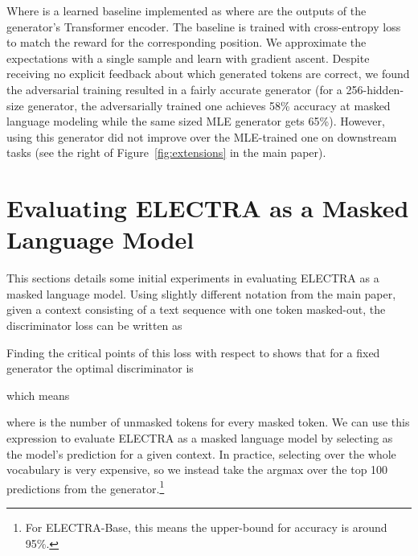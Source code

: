 \documentclass{article}
\newcommand{\alns}[1] {
	
}
\newcommand{\pdata}{p_{\text{data}}}
\newcommand{\pmask}{p_{\text{mask}}}
\newcommand{\lossds}{\mathcal{L}_\text{Disc}}
\begin{document}
Where  is a learned baseline implemented as  
where  are the outputs of the generator's Transformer encoder.
The baseline is trained with cross-entropy loss to match the reward for the corresponding position.
We approximate the expectations with a single sample and learn  with gradient ascent.
Despite receiving no explicit feedback about which generated tokens are correct, we found the adversarial training resulted in a fairly accurate generator (for a 256-hidden-size generator, the adversarially trained one achieves 58\% accuracy at masked language modeling while the same sized MLE generator gets 65\%).
However, using this generator did not improve over the MLE-trained one on downstream tasks (see the right of Figure~\ref{fig:extensions} in the main paper).

\section{Evaluating ELECTRA as a Masked Language Model}
This sections details some initial experiments in evaluating ELECTRA as a masked language model. 
Using slightly different notation from the main paper, given a context  consisting of a text sequence with one token  masked-out, the discriminator loss can be written as
\alns{
    \lossds = -\sum\limits_{x\in\text{vocab}} \Big( &(1 - \pmask) \pdata(x|c)\log D(x, c) + \text{\hspace{19mm}//unmasked token}\\
    &\pmask\pdata(x|c)p_G(x|c)\log D(x, c) + \text{\hspace{17mm}//generator samples correct token}\\
    &\pmask(1 - \pdata(x|c))p_G(x|c)\log(1 - D(x, c))\Big) \text{\hspace{2mm}//generator samples incorrect token} \\
}
Finding the critical points of this loss with respect to  shows that for a fixed generator the optimal discriminator is
\alns{
    D(x, c) = \pdata(x|c)(a + p_G(x|c))/(a\pdata(x|c) + p_G(x|c))
}
which means
\alns{
    \pdata(x|c) = D(x, c)p_G(x|c) / (a(1 - D(x, c)) + p_G(x|c))
}
where  is the number of unmasked tokens for every masked token.
We can use this expression to evaluate ELECTRA as a masked language model by selecting  as the model's prediction for a given context.
In practice, selecting over the whole vocabulary is very expensive, so we instead take the argmax over the top 100 predictions from the generator.\footnote{For ELECTRA-Base, this means the upper-bound for accuracy is around 95\%.}
\end{document}
